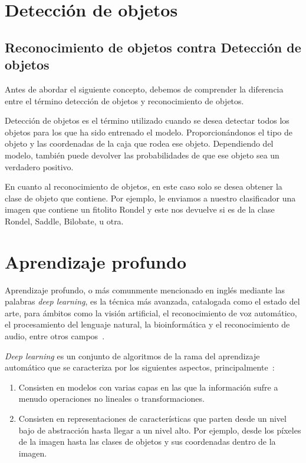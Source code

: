\section{Detección de objetos}

\subsection{Reconocimiento de objetos contra Detección de objetos}

Antes de abordar el siguiente concepto, debemos de comprender la diferencia entre el término detección de objetos y reconocimiento de objetos.

Detección de objetos es el término utilizado cuando se desea detectar todos los objetos para los que ha sido entrenado el modelo. Proporcionándonos el tipo de objeto y las coordenadas de la caja que rodea ese objeto. Dependiendo del modelo, también puede devolver las probabilidades de que ese objeto sea un verdadero positivo.

En cuanto al reconocimiento de objetos, en este caso solo se desea obtener la clase de objeto que contiene. Por ejemplo, le enviamos a nuestro clasificador una imagen que contiene un fitolito Rondel y este nos devuelve si es de la clase Rondel, Saddle, Bilobate, u otra.

\section{Aprendizaje profundo}

Aprendizaje profundo, o más comunmente mencionado en inglés mediante las palabras \textit{deep learning}, es la técnica más avanzada, catalogada como el estado del arte, para ámbitos como la visión artificial, el reconocimiento de voz automático, el procesamiento del lenguaje natural,  la bioinformática y el reconocimiento de audio, entre otros campos~\cite{ms:deeplearning}.

\textit{Deep learning} es un conjunto de algoritmos de la rama del aprendizaje automático que se caracteriza por los siguientes aspectos, principalmente~\cite{ms:deeplearning}:

\begin{enumerate}
	\item Consisten en modelos con varias capas en las que la información sufre a menudo operaciones no lineales o transformaciones.
	\item Consisten en representaciones de características que parten desde un nivel bajo de abstracción hasta llegar a un nivel alto. Por ejemplo, desde los píxeles de la imagen hasta las clases de objetos y sus coordenadas dentro de la imagen.
\end{enumerate}

